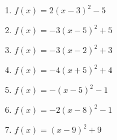 \documentclass{article}%
\begin{document}
\begin{enumerate}[label=\alph*)]
\item%
\newline\vspace{0.5cm} $f(x)=2(x-3)^2 -5$%
\item%
\newline\vspace{0.5cm} $f(x)=-3(x-5)^2 +5$%
\item%
\newline\vspace{0.5cm} $f(x)=-3(x-2)^2 +3$%
\item%
\newline\vspace{0.5cm} $f(x)=-4(x+5)^2 +4$%
\item%
\newline\vspace{0.5cm} $f(x)=-(x-5)^2 -1$%
\item%
\newline\vspace{0.5cm} $f(x)=-2(x-8)^2 -1$%
\item%
\newline\vspace{0.5cm} $f(x)=(x-9)^2 +9$%
\end{enumerate}

%
\end{document}
